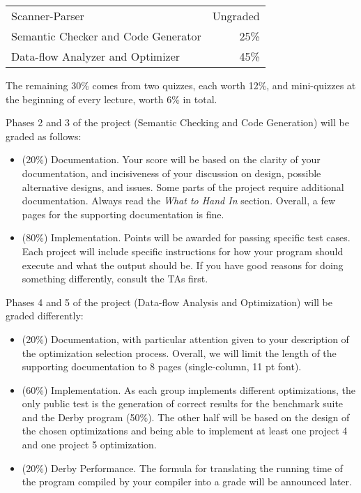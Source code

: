 \documentclass[11pt]{article}
\begin{document}
\begin{tabular}{lr}
Scanner-Parser & Ungraded \\
Semantic Checker and Code Generator & 25\% \\
Data-flow Analyzer and Optimizer & 45\% \\
\end{tabular}

The remaining 30\% comes from two quizzes, each worth 12\%, and mini-quizzes at the beginning of every lecture, worth 6\% in total.

Phases 2 and 3 of the project (Semantic Checking and Code Generation) will be graded as follows:

\begin{itemize}
\item (20\%) Documentation.
  Your score will be based on the clarity of your documentation, and incisiveness of your discussion on design, possible alternative designs, and issues.
  Some parts of the project require additional documentation.
  Always read the \emph{What to Hand In} section.
  Overall, a few pages for the supporting documentation is fine.
\item (80\%) Implementation.
  Points will be awarded for passing specific test cases.
  Each project will include specific instructions for how your program should execute and what the output should be.
  If you have good reasons for doing something differently, consult the TAs first.
\end{itemize}

Phases 4 and 5 of the project (Data-flow Analysis and Optimization) will be graded differently:

\begin{itemize}
\item (20\%) Documentation, with particular attention given to your description of the optimization selection process.
  Overall, we will limit the length of the supporting documentation to 8 pages (single-column, 11 pt font).
\item (60\%) Implementation.
  As each group implements different optimizations, the only public test is the generation of correct results for the benchmark suite and the Derby program (50\%).
  The other half will be based on the design of the chosen optimizations and being able to implement at least one project 4 and one project 5 optimization.
\item (20\%) Derby Performance.
  The formula for translating the running time of the program compiled by your compiler into a grade will be announced later.
\end{itemize}
\end{document}
